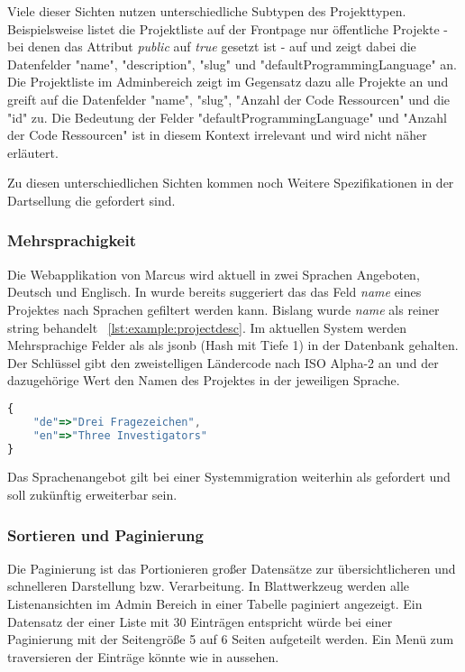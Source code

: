 Viele dieser Sichten nutzen unterschiedliche Subtypen des Projekttypen.
Beispielsweise listet die Projektliste auf der Frontpage nur öffentliche Projekte - bei denen das Attribut \emph{public} auf \emph{true} gesetzt ist -
auf und zeigt dabei die Datenfelder "name", "description", "slug" und "defaultProgrammingLanguage" an.
Die Projektliste im Adminbereich zeigt im Gegensatz dazu alle Projekte an und greift auf
die Datenfelder "name", "slug", "Anzahl der Code Ressourcen" und die "id" zu.
Die Bedeutung der Felder "defaultProgrammingLanguage" und "Anzahl der Code Ressourcen" ist in diesem Kontext irrelevant und wird nicht näher erläutert.

Zu diesen unterschiedlichen Sichten kommen noch Weitere Spezifikationen in der Dartsellung die gefordert sind.

\subsubsection{Mehrsprachigkeit}
Die Webapplikation von Marcus wird aktuell in zwei Sprachen Angeboten, Deutsch und Englisch.
In  wurde bereits suggeriert das das Feld \emph{name} eines Projektes nach Sprachen gefiltert werden kann.
Bislang wurde \emph{name} als reiner string behandelt ~\ref{lst:example:projectdesc}. Im aktuellen System werden Mehrsprachige Felder als
als jsonb (Hash mit Tiefe 1) in der Datenbank gehalten. Der Schlüssel gibt den zweistelligen Ländercode nach ISO Alpha-2 \cite{iso-alpha-2} an
und der dazugehörige Wert den Namen des Projektes in der jeweiligen Sprache.

\begin{lstlisting}[language=JavaScript,float=h!,caption={Speicherung der Projektnamen als jsonb}, label={sec:requirements:multilang}]
{
    "de"=>"Drei Fragezeichen",
    "en"=>"Three Investigators"
}
\end{lstlisting}

Das Sprachenangebot gilt bei einer Systemmigration weiterhin als gefordert und soll zukünftig erweiterbar sein.

\subsubsection{Sortieren und Paginierung}
Die Paginierung ist das Portionieren großer Datensätze zur übersichtlicheren und schnelleren Darstellung bzw. Verarbeitung.
In Blattwerkzeug werden alle Listenansichten im Admin Bereich in einer Tabelle paginiert angezeigt.
Ein Datensatz der einer Liste mit 30 Einträgen entspricht würde bei einer Paginierung mit der Seitengröße 5 auf 6 Seiten aufgeteilt werden.
Ein Menü zum traversieren der Einträge könnte wie in  aussehen.

